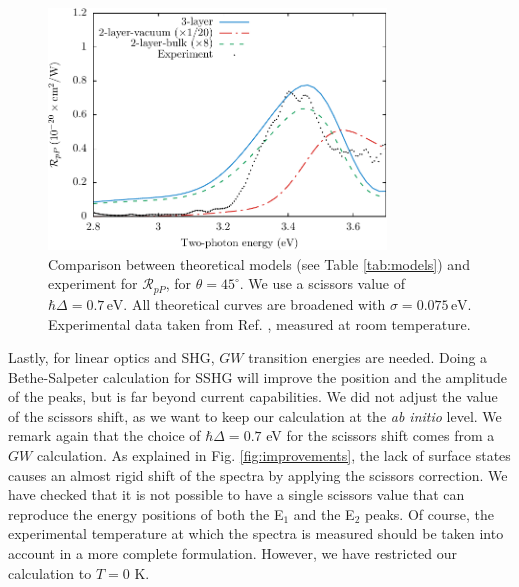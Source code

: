 \documentclass[11pt]{book}
\begin{document}
\begin{figure}
\centering
\includegraphics[width=0.8\textwidth]{../figures/04-results/fig-4_4_07}
\caption{Comparison between theoretical models (see Table
\ref{tab:models}) and experiment for $\mathcal{R}_{pP}$, for
$\theta=45^{\circ}$. We use a scissors value of $\hbar\Delta = 0.7\,\text{eV}$.
All theoretical curves are broadened with $\sigma=0.075\,\text{eV}$.
Experimental data taken from Ref. \cite{mitchellSS01}, measured at room
temperature.}
\label{fig:mitchellRpP}
\end{figure}

Lastly, for linear optics and SHG, $GW$ transition energies are needed. Doing a
Bethe-Salpeter calculation for SSHG will improve the position and the amplitude
of the peaks, but is far beyond current capabilities.\cite{puff} We did not
adjust the value of the scissors shift, as we want to keep our calculation at
the {\em ab initio} level. We remark again that the choice of $\hbar\Delta=0.7$
eV for the scissors shift comes from a $GW$ calculation.\cite{liPRB10} As
explained in Fig. \ref{fig:improvements}, the lack of surface states causes an
almost rigid shift of the spectra by applying the scissors correction. We have
checked that it is not possible to have a single scissors value that can
reproduce the energy positions of both the E$_{1}$ and the E$_{2}$ peaks. Of
course, the experimental temperature at which the spectra is measured should be
taken into account in a more complete formulation. However, we have restricted
our calculation to $T=0$ K.
\end{document}
